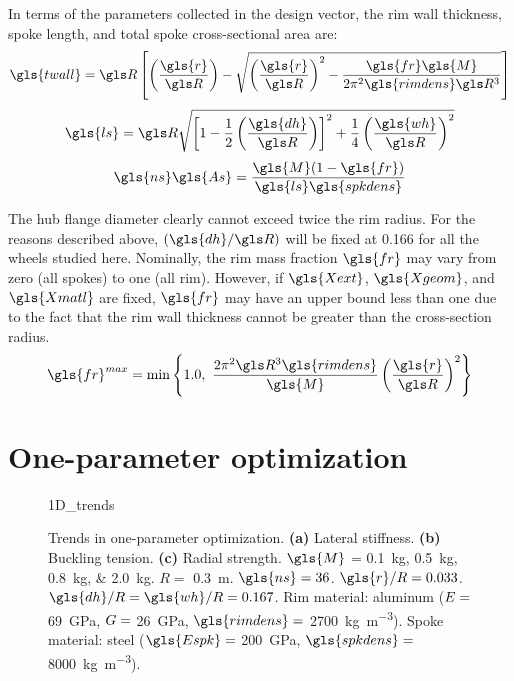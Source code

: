 \documentclass[\rootdir/thesis.tex]{subfiles}
\begin{document}
In terms of the parameters collected in the design vector, the rim wall thickness, spoke length, and total spoke cross-sectional area are:
\begin{equation}
\label{eqn:design:t}
\gls{twall} = \R\left[ \left(\frac{\gls{r}}{\R}\right) - \sqrt{\left(\frac{\gls{r}}{\R}\right)^2 - \frac{\gls{fr}\gls{M}}{2\pi^2\gls{rimdens}\R^3}}\right]
\end{equation}
\begin{equation}
\label{eqn:design:ls}
\gls{ls} = \R\sqrt{\left[1-\frac{1}{2}\left(\frac{\gls{dh}}{\R}\right)\right]^2 + \frac{1}{4}\left(\frac{\gls{wh}}{\R}\right)^2}
\end{equation}
\begin{equation}
\label{eqn:design:nsAs}
\gls{ns}\gls{As} = \frac{\gls{M}(1-\gls{fr})}{\gls{ls}\gls{spkdens}}
\end{equation}

The hub flange diameter clearly cannot exceed twice the rim radius. For the reasons described above, $(\gls{dh}/\R)$ will be fixed at 0.166 for all the wheels studied here. Nominally, the rim mass fraction $\gls{fr}$ may vary from zero (all spokes) to one (all rim). However, if $\gls{Xext}$, $\gls{Xgeom}$, and $\gls{Xmatl}$ are fixed, $\gls{fr}$ may have an upper bound less than one due to the fact that the rim wall thickness cannot be greater than the cross-section radius.
\begin{equation}
\label{eqn:frim_max}
\gls{fr}^{max} = \min\left\lbrace 1.0,\,\, \frac{2\pi^2 \R^3\gls{rimdens}}{\gls{M}}\left(\frac{\gls{r}}{\R}\right)^2 \right\rbrace
\end{equation}

\section{One-parameter optimization}

\begin{figure}
\centering
{1D_trends}
\caption[Trends in one-parameter optimization]{Trends in one-parameter optimization. \textbf{(a)} Lateral stiffness. \textbf{(b)} Buckling tension. \textbf{(c)} Radial strength. $\gls{M}$ = \SIlist[list-units=single]{0.1;0.5;0.8;2.0}{kg}. $R=$ \SI{0.3}{m}. $\gls{ns}=36$. $\gls{r}/R=0.033$. $\gls{dh}/R=\gls{wh}/R=0.167$. Rim material: aluminum ($E=$ \SI{69}{GPa}, $G=$ \SI{26}{GPa}, $\gls{rimdens}=$ \SI{2700}{kg.m^{-3}}). Spoke material: steel ($\gls{Espk}=$ \SI{200}{GPa}, $\gls{spkdens}=$ \SI{8000}{kg.m^{-3}}).}
\label{fig:opt_1D_trends}
\end{figure}
\end{document}
